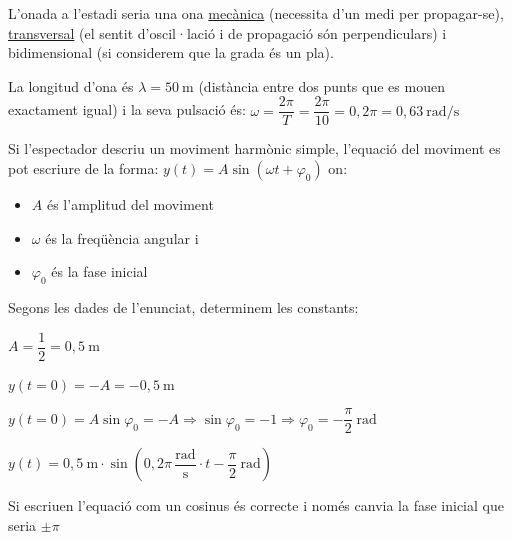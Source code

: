 \begin{solapartat}
L'onada a l'estadi seria una ona \underline{mecànica}  (necessita d'un medi per propagar-se), \underline{transversal}  (el sentit d'oscil·lació i de propagació són perpendiculars) i bidimensional (si considerem que la grada és un pla).

\medskip
La longitud d'ona és \underline{$\lambda = 50\ \mathrm{m}$}  (distància entre dos punts que es mouen exactament igual) i la seva pulsació és: $\omega = \dfrac{2\pi}{T} = \dfrac{2\pi}{10} = 0,2\pi = 0,63\ \mathrm{rad/s}$ 
\end{solapartat}

\begin{solapartat}
Si l'espectador descriu un moviment harmònic simple, l'equació del moviment es pot escriure de la forma: $y(t) = A\sin(\omega t + \varphi_0)$  on:
\begin{itemize}
  \item $A$ és l'amplitud del moviment
  \item $\omega$ és la freqüència angular i
  \item $\varphi_0$ és la fase inicial
\end{itemize}
Segons les dades de l'enunciat, determinem les constants:

\medskip
{} $A = \dfrac{1}{2} = 0,5\ \mathrm{m}$

\medskip
{} $y(t = 0) = -A = -0,5\ \mathrm{m}$

\medskip
{} $y(t = 0) = A\sin\varphi_0 = -A \Rightarrow \sin\varphi_0 = -1 \Rightarrow \varphi_0 = -\dfrac{\pi}{2}\ \mathrm{rad}$

\medskip
{} $y(t) = 0,5\ \mathrm{m}\cdot\sin\left(0,2\pi\,\dfrac{\mathrm{rad}}{\mathrm{s}}\cdot t - \dfrac{\pi}{2}\ \mathrm{rad}\right)$

\medskip
Si escriuen l'equació com un cosinus és correcte i només canvia la fase inicial que seria $\pm\pi$
\end{solapartat}
